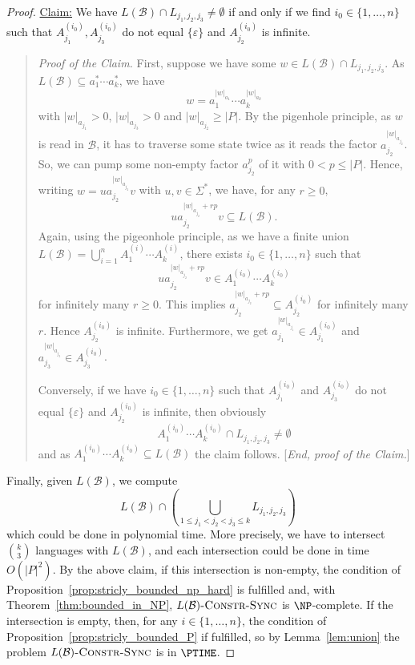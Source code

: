 \begin{proof}
 \noindent\underline{Claim:} We have $L(\mathcal B) \cap L_{j_1, j_2, j_3} \ne \emptyset$
 if and only if we find $i_0 \in \{1,\ldots,n\}$ such
 that $A_{j_1}^{(i_0)}, A_{j_3}^{(i_0)}$ do not equal $\{\varepsilon\}$
 and $A_{j_2}^{(i_0)}$ is infinite.
 \begin{quote}
   \emph{Proof of the Claim.} First, suppose we have
   some $w \in L(\mathcal B) \cap L_{j_1, j_2, j_3}$.
   As $L(\mathcal B) \subseteq a_1^* \cdots a_k^*$, we have
   \[
    w = a_1^{|w|_{a_1}} \cdots a_k^{|w|_{a_k}}
   \]
   with $|w|_{a_{j_1}} > 0$, $|w|_{a_{j_3}} > 0$
   and $|w|_{a_{j_2}} \ge |P|$.
   By the pigenhole principle, as $w$ is read in $\mathcal B$,
      it has to traverse some state twice as it reads 
      the factor $a_{j_2}^{|w|_{a_{j_2}}}$. So, we can pump
      some non-empty factor $a_{j_2}^p$ of it with $0 < p \le |P|$.
      Hence, writing $w = ua_{j_2}^{|w|_{a_{j_2}}}v$ with $u,v \in \Sigma^*$,
      we have, for any $r \ge 0$,
      \[
             ua_{j_2}^{|w|_{a_{j_2}} + rp}v \subseteq L(\mathcal B).
      \] %
   Again, using the pigeonhole principle, as we have a 
   finite union $L(\mathcal B) = \bigcup_{i=1}^n A_1^{(i)} \cdots A_k^{(i)}$, there
   exists $i_0 \in \{1,\ldots, n\}$ such that
   \[
    ua_{j_2}^{|w|_{a_{j_2}} + rp}v \in A_1^{(i_0)} \cdots A_k^{(i_0)}
   \]
   for infinitely many $r \ge 0$. This implies $a_{j_2}^{|w|_{a_{j_2}} + rp} \subseteq A_{j_2}^{(i_0)}$
   for infinitely many $r$. Hence $A_{j_2}^{(i_0)}$
   is infinite. Furthermore, we
   get $a_{j_1}^{|w|_{a_{j_1}}} \in A_{j_1}^{(i_0)}$
   and $a_{j_3}^{|w|_{a_{j_3}}} \in A_{j_3}^{(i_0)}$.
  
  
   Conversely, if we have $i_0 \in \{1,\ldots,n\}$
   such that $A_{j_1}^{(i_0)}$ and $A_{j_3}^{(i_0)}$
   do not equal $\{\varepsilon\}$ and $A_{j_2}^{(i_0)}$
   is infinite, then obviously
   \[
    A_1^{(i_0)} \cdots A_k^{(i_0)} \cap L_{j_1,j_2,j_3} \ne \emptyset 
   \]
   and as $A_1^{(i_0)} \cdots A_k^{(i_0)} \subseteq L(\mathcal B)$
   the claim follows.
   [\emph{End, proof of the Claim.}]
 \end{quote}
 
 
 Finally, given $L(\mathcal B)$, we compute
 \[
  L(\mathcal B) \cap \left( \bigcup_{1 \le j_1 < j_2  < j_3 \le k} L_{j_1, j_2, j_3}\right)
 \]
 which could be done in polynomial time. More precisely,
 we have to intersect $\binom{k}{3}$ languages with $L(\mathcal B)$,
 and each intersection could be done in time $O(|P|^2)$.
 By the above claim, if this intersection is non-empty, the condition of Proposition~\ref{prop:stricly_bounded_np_hard}
 is fulfilled  and, with Theorem~\ref{thm:bounded_in_NP}, $L(\mathcal B)\textsc{-Constr-Sync}$
 is $\NP$-complete.
 If the intersection is empty, then, for any $i \in \{1,\ldots,n\}$,
 the condition of Proposition~\ref{prop:stricly_bounded_P}
 if fulfilled, so by Lemma~\ref{lem:union}
 the problem $L(\mathcal B)\textsc{-Constr-Sync}$ is in $\PTIME$.
\end{proof}